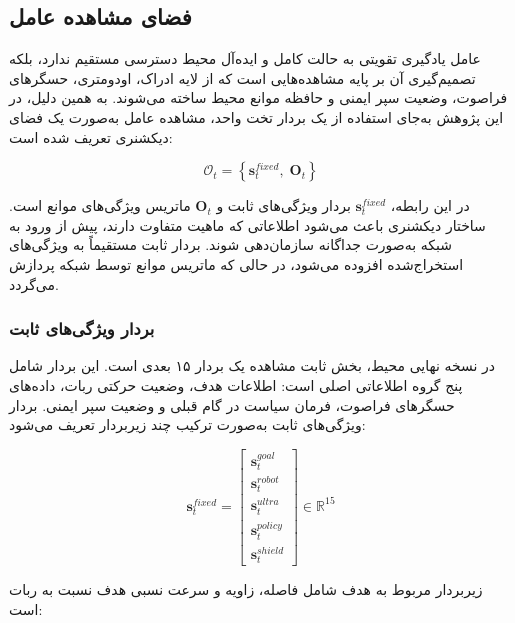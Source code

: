 \subsection{فضای مشاهده عامل}
\label{subsec:observation_space_final}

عامل یادگیری تقویتی به حالت کامل و ایده‌آل محیط دسترسی مستقیم ندارد، بلکه تصمیم‌گیری آن بر پایه مشاهده‌هایی است که از لایه ادراک، اودومتری، حسگرهای فراصوت، وضعیت سپر ایمنی و حافظه موانع محیط ساخته می‌شوند. به همین دلیل، در این پژوهش به‌جای استفاده از یک بردار تخت واحد، مشاهده عامل به‌صورت یک فضای دیکشنری تعریف شده است:

\begin{equation}
	\mathcal{O}_t =
	\left\{
	\mathbf{s}^{fixed}_t,\;
	\mathbf{O}_t
	\right\}
	\label{eq:dict_observation_final}
\end{equation}

در این رابطه، \(\mathbf{s}^{fixed}_t\) بردار ویژگی‌های ثابت و \(\mathbf{O}_t\) ماتریس ویژگی‌های موانع است. ساختار دیکشنری باعث می‌شود اطلاعاتی که ماهیت متفاوت دارند، پیش از ورود به شبکه به‌صورت جداگانه سازمان‌دهی شوند. بردار ثابت مستقیماً به ویژگی‌های استخراج‌شده افزوده می‌شود، در حالی که ماتریس موانع توسط شبکه  پردازش می‌گردد.

\subsubsection{بردار ویژگی‌های ثابت}
\label{subsubsec:fixed_features_final}

در نسخه نهایی محیط، بخش ثابت مشاهده یک بردار ۱۵ بعدی است. این بردار شامل پنج گروه اطلاعاتی اصلی است: اطلاعات هدف، وضعیت حرکتی ربات، داده‌های حسگرهای فراصوت، فرمان سیاست در گام قبلی و وضعیت سپر ایمنی. بردار ویژگی‌های ثابت به‌صورت ترکیب چند زیر‌بردار تعریف می‌شود:

\begin{equation}
	\mathbf{s}^{fixed}_t =
	\begin{bmatrix}
		\mathbf{s}^{goal}_t \\
		\mathbf{s}^{robot}_t \\
		\mathbf{s}^{ultra}_t \\
		\mathbf{s}^{policy}_t \\
		\mathbf{s}^{shield}_t
	\end{bmatrix}
	\in \mathbb{R}^{15}
	\label{eq:fixed_obs_15d_final}
\end{equation}

زیر‌بردار مربوط به هدف شامل فاصله، زاویه و سرعت نسبی هدف نسبت به ربات است:

